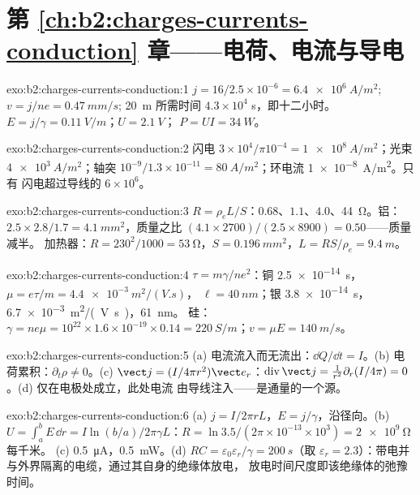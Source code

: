 \section*{第 \ref{ch:b2:charges-currents-conduction} 章——电荷、电流与导电}

\begin{solution}{exo:b2:charges-currents-conduction:1}
$j = 16/2.5 \times 10^{-6} = \qty{6.4e6}{A/m^2}$; $v = j/ne = \qty{0.47}{mm/s}$; \qty{20}{m}
所需时间 $4.3 \times 10^4$ s，即十二小时。$E = j/\gamma = \qty{0.11}{V/m}$；$U = \qty{2.1}{V}$；
$P = UI = \qty{34}{W}$。
\end{solution}

\begin{solution}{exo:b2:charges-currents-conduction:2}
闪电 $3 \times 10^4/\pi10^{-4} = \qty{1e8}{A/m^2}$；光束 $\qty{4e3}{A/m^2}$；轴突
$10^{-9}/1.3 \times 10^{-11} = \qty{80}{A/m^2}$；环电流 \qty{1e-8}{A/m^2}。只有
闪电超过导线的 $6 \times 10^6$。
\end{solution}

\begin{solution}{exo:b2:charges-currents-conduction:3}
$R = \rho_eL/S$：$0.68$、$1.1$、$4.0$、\qty{44}{\ohm}。铝：$2.5 \times 2.8/1.7 =
\qty{4.1}{mm^2}$，质量之比 $(4.1 \times 2700)/(2.5 \times 8900) = 0.50$——质量减半。
加热器：$R = 230^2/1000 = \qty{53}{\ohm}$，$S = \qty{0.196}{mm^2}$，$L = RS/\rho_e = \qty{9.4}{m}$。
\end{solution}

\begin{solution}{exo:b2:charges-currents-conduction:4}
$\tau = m\gamma/ne^2$：铜 \qty{2.5e-14}{s}，$\mu = e\tau/m = \qty{4.4e-3}{m^2/(V.s)}$，
$\ell = \qty{40}{nm}$；银 \qty{3.8e-14}{s}，\qty{6.7e-3}{m^2/(V.s)}，\qty{61}{nm}。
硅：$\gamma = ne\mu = 10^{22} \times 1.6 \times 10^{-19} \times 0.14 = \qty{220}{S/m}$；$v =
\mu E = \qty{140}{m/s}$。
\end{solution}

\begin{solution}{exo:b2:charges-currents-conduction:5}
(a) 电流流入而无流出：$\dd Q/\dd t = I$。(b) 电荷累积：$\partial_t
\rho \ne 0$。(c) $\vect j = (I/4\pi r^2)\vect e_r$：$\operatorname{div}\vect j = \frac1{r^2}
\partial_r(I/4\pi) = 0$。(d) 仅在电极处成立，此处电流
由导线注入——是通量的一个源。
\end{solution}

\begin{solution}{exo:b2:charges-currents-conduction:6}
(a) $j = I/2\pi rL$，$E = j/\gamma$，沿径向。(b) $U = \int_a^bE\,\dd r = I\ln(b/a)/
2\pi\gamma L$：$R = \ln3.5/(2\pi \times 10^{-13} \times 10^3) = \qty{2e9}{\ohm}$ 每千米。
(c) \qty{0.5}{\micro A}，\qty{0.5}{mW}。(d) $RC = \varepsilon_0\varepsilon_r/\gamma = \qty{200}{s}$（取
$\varepsilon_r = 2.3$）：带电并与外界隔离的电缆，通过其自身的绝缘体放电，
放电时间尺度即该绝缘体的弛豫时间。
\end{solution}


